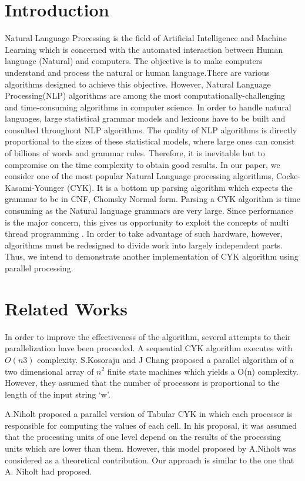 \documentclass[12pt]{article}
\begin{document}
\section{Introduction}
Natural Language Processing is the field of Artificial Intelligence and Machine Learning which is concerned with the automated interaction between Human language (Natural) and computers. The objective is to make computers understand and process the natural or human language.There are various algorithms designed to achieve this objective.
However, Natural Language Processing(NLP) algorithms are among the most computationally-challenging and time-consuming algorithms in computer science. In order to handle natural languages, large statistical grammar models and lexicons have to be built and consulted throughout NLP algorithms. The quality of NLP algorithms is directly proportional to the sizes of these statistical models, where large ones can consist of billions of words and grammar rules. Therefore, it is inevitable but to compromise on the time complexity to obtain good results.
In our paper, we consider one of the most popular Natural Language processing algorithms, Cocke-Kasami-Younger (CYK). It is a bottom up parsing algorithm which expects the grammar to be in CNF, Chomsky Normal form. Parsing a CYK algorithm is time consuming as the Natural language grammars are very large. Since performance is the major concern, this gives us opportunity to exploit the concepts of multi thread programming . In order to take advantage of such hardware, however, algorithms must be redesigned to divide work into largely independent parts. Thus, we intend to demonstrate another implementation of CYK algorithm using parallel processing.
\section{Related Works}
In order to improve the effectiveness of the algorithm, several attempts to their parallelization have been proceeded. A sequential CYK algorithm executes with $O(n3)$ complexity. S.Kosoraju and J Chang proposed a parallel algorithm of a two dimensional array of $n^2$ finite state machines which yields a O(n) complexity\cite{a}\cite{b}. However, they assumed that the number of processors is proportional to the length of the input string ‘w’.

\vspace{2 mm}


A.Niholt \cite{c} proposed a parallel version of Tabular CYK in which each processor is responsible for computing the values of each cell. In his proposal, it was assumed that the processing units of one level depend on the results of the processing units which are lower than them. However, this model proposed by A.Niholt was considered as a theoretical contribution. Our approach is similar to the one that A. Niholt had proposed.
\end{document}
